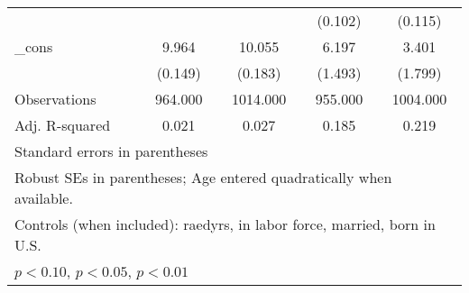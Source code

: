 \begin{table}[htbp]
\begin{tabular}{l*{4}{c}}
          &                  &                  &  (0.102)         &  (0.115)         \\
\_cons    &    9.964\sym{***}&   10.055\sym{***}&    6.197\sym{***}&    3.401\sym{*}  \\
          &  (0.149)         &  (0.183)         &  (1.493)         &  (1.799)         \\
\midrule
Observations&  964.000         & 1014.000         &  955.000         & 1004.000         \\
Adj. R-squared&    0.021         &    0.027         &    0.185         &    0.219         \\
\bottomrule
\multicolumn{5}{l}{\footnotesize Standard errors in parentheses}\\
\multicolumn{5}{l}{\footnotesize Robust SEs in parentheses; Age entered quadratically when available.}\\
\multicolumn{5}{l}{\footnotesize Controls (when included): raedyrs, in labor force, married, born in U.S.}\\
\multicolumn{5}{l}{\footnotesize \sym{*} \(p<0.10\), \sym{**} \(p<0.05\), \sym{***} \(p<0.01\)}\\
\end{tabular}
\end{table}
